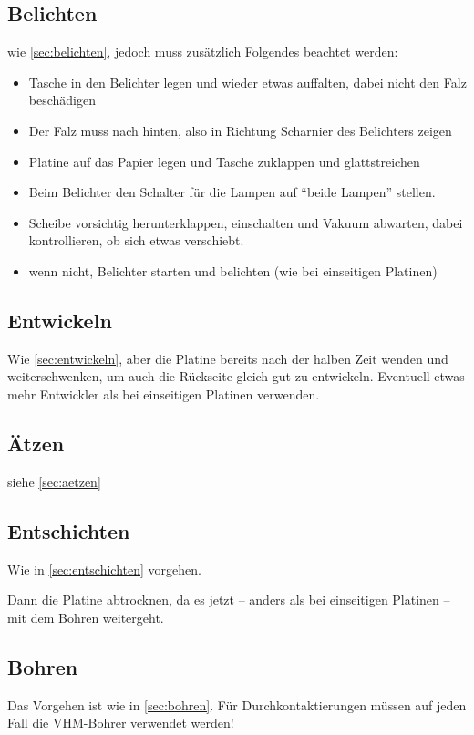 \documentclass{\basedir/fablab-document}
\begin{document}
\subsection{Belichten}
wie \ref{sec:belichten}, jedoch muss zusätzlich Folgendes beachtet werden:

\begin{itemize}
\item Tasche in den Belichter legen und wieder etwas auffalten, dabei nicht den Falz beschädigen
\item Der Falz muss nach hinten, also in Richtung Scharnier des Belichters zeigen
\item Platine auf das Papier legen und Tasche zuklappen und glattstreichen
\item Beim Belichter den Schalter für die Lampen auf ``beide Lampen'' stellen.
\item Scheibe vorsichtig herunterklappen, einschalten und Vakuum abwarten, dabei kontrollieren, ob sich etwas verschiebt.
\item wenn nicht, Belichter starten und belichten (wie bei einseitigen Platinen)
\end{itemize}

\subsection{Entwickeln}
Wie \ref{sec:entwickeln}, aber die Platine bereits nach der halben Zeit wenden und weiterschwenken, um auch die Rückseite gleich gut zu entwickeln. Eventuell etwas mehr Entwickler als bei einseitigen Platinen verwenden.

\subsection{Ätzen}
siehe \ref{sec:aetzen}

\subsection{Entschichten}
Wie in \ref{sec:entschichten} vorgehen.

Dann die Platine abtrocknen, da es jetzt -- anders als bei einseitigen Platinen -- mit dem Bohren weitergeht.

\subsection{Bohren}
Das Vorgehen ist wie in \ref{sec:bohren}. Für Durchkontaktierungen müssen auf jeden Fall die VHM-Bohrer verwendet werden!
\end{document}
